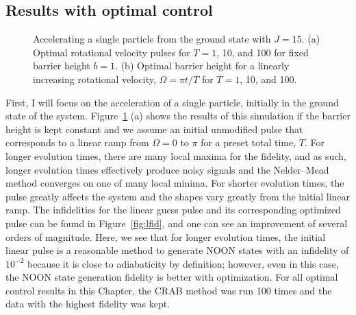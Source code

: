 \subsection{Results with optimal control}

\begin{figure}
 \centering
 \caption{Accelerating a single particle from the ground state with $J=15$.
 (a) Optimal rotational velocity pulses for $T = 1$, 10, and 100 for fixed barrier height $b=1$.
 (b) Optimal barrier height for a linearly increasing rotational velocity, $\Omega = \pi t/T$ for $T=1$, 10, and 100.}
 \label{fig:pulses}
\end{figure}

First, I will focus on the acceleration of a single particle, initially in the ground state of the system.
Figure~\ref{fig:pulses} (a) shows the results of this simulation if the barrier height is kept constant and we assume an initial unmodified pulse that corresponds to a linear ramp from $\Omega = 0$ to $\pi$ for a preset total time, $T$.
For longer evolution times, there are many local maxima for the fidelity, and 
as such, longer evolution times effectively produce noisy signals and the Nelder--Mead method converges on one of many local minima.
For shorter evolution times, the pulse greatly affects the system and the shapes vary greatly from the initial linear ramp.
The infidelities for the linear guess pulse and its corresponding optimized pulse can be found in Figure~\ref{fig:lfid}, and one can see an improvement of several orders of magnitude.
Here, we see that for longer evolution times, the initial linear pulse is a reasonable method to generate NOON states with an infidelity of $10^{-2}$ because it is close to adiabaticity by definition; however, even in this case, the NOON state generation fidelity is better with optimization.
For all optimal control results in this Chapter, the CRAB method was run 100 times and the data with the highest fidelity was kept.

